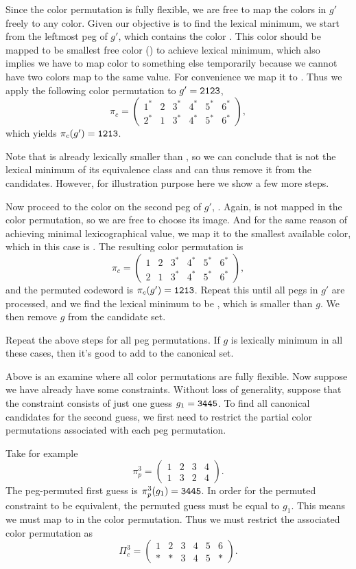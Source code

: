 Since the color permutation is fully flexible, we are free to map the colors in $g'$ freely to any color. Given our objective is to find the lexical minimum, we start from the leftmost peg of $g'$, which contains the color . This color should be mapped to be smallest free color () to achieve lexical minimum, which also implies we have to map color  to something else temporarily because we cannot have two colors map to the same value. For convenience we map it to . Thus we apply the following color permutation to $g' = \texttt{2123}$,
\[
\pi_c = 
\begin{pmatrix}
1^* & 2 & 3^* & 4^* & 5^* & 6^*  \\
2^* & 1 & 3^* & 4^* & 5^* & 6^* 
\end{pmatrix} ,
\]
which yields $\pi_c(g') = \texttt{1213}$.

Note that  is already lexically smaller than , so we can conclude that  is not the lexical minimum of its equivalence class and can thus remove it from the candidates. However, for illustration purpose here we show a few more steps.

Now proceed to the color on the second peg of $g'$, . Again,  is not mapped in the color permutation, so we are free to choose its image. And for the same reason of achieving minimal lexicographical value, we map it to the smallest available color, which in this case is . The resulting color permutation is
\[
\pi_c = 
\begin{pmatrix}
1 & 2 & 3^* & 4^* & 5^* & 6^*  \\
2 & 1 & 3^* & 4^* & 5^* & 6^* 
\end{pmatrix} ,
\]
and the permuted codeword is $\pi_c(g') = \texttt{1213}$. Repeat this until all pegs in $g'$ are processed, and we find the lexical minimum to be , which is smaller than $g$. We then remove $g$ from the candidate set. 

Repeat the above steps for all peg permutations. If $g$ is lexically minimum in all these cases, then it's good to add to the canonical set.

Above is an examine where all color permutations are fully flexible. Now suppose we have already have some constraints. Without loss of generality, suppose that the constraint consists of just one guess $g_1 = \texttt{3445}$. To find all canonical candidates for the second guess, we first need to restrict the partial color permutations associated with each peg permutation. 

Take for example 
\[
\pi_p^3 = 
\begin{pmatrix}
1 & 2 & 3 & 4 \\
1 & 3 & 2 & 4
\end{pmatrix} .
\] 
The peg-permuted first guess is $\pi_p^3(g_1) = \texttt{3445}$. In order for the permuted constraint to be equivalent, the permuted guess must be equal to $g_1$. This means we must map  to  in the color permutation. Thus we must restrict the associated color permutation as
\[
\Pi_c^3 = 
\begin{pmatrix}
1 & 2 & 3 & 4 & 5 & 6 \\
* & * & 3 & 4 & 5 & * 
\end{pmatrix} .
\]

